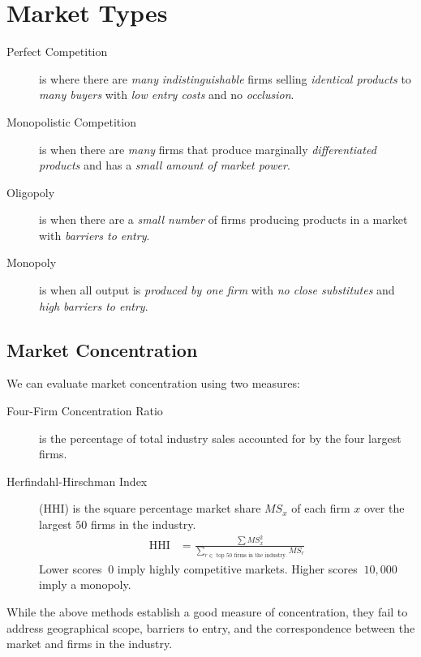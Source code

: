                 \section{Market Types} %
                \label{sec:market_types}
                    \begin{description}
                        \item[Perfect Competition] is where there are \textit{many} \textit{indistinguishable} firms selling \textit{identical products} to \textit{many buyers} with \textit{low entry costs} and no \textit{occlusion}.
                        \item[Monopolistic Competition] is when there are \textit{many} firms that produce marginally \textit{differentiated products} and has a \textit{small amount of market power}.
                        \item[Oligopoly] is when there are a \textit{small number} of firms producing products in a market with \textit{barriers to entry}.
                        \item[Monopoly] is when all output is \textit{produced by one firm} with \textit{no close substitutes} and \textit{high barriers to entry}.
                    \end{description}
                    \subsection{Market Concentration} %
                    \label{sub:market_concentration}
                        We can evaluate market concentration using two measures:
                        \begin{description}
                            \item[Four-Firm Concentration Ratio] is the percentage of total industry sales accounted for by the four largest firms.
                            \item[Herfindahl-Hirschman Index] (HHI) is the square percentage market share $MS_x$ of each firm $x$ over the largest $50$ firms in the industry.
                            \begin{align*}
                                \text{HHI} &=
                                \frac{\sum{MS_x^2}}{\sum_{r \in \text { top 50 firms in the industry.}}{MS_r}}
                            \end{align*}
                            Lower scores $~0$ imply highly competitive markets.
                            Higher scores $~10,000$ imply a monopoly.
                        \end{description}
                        While the above methods establish a good measure of concentration, they fail to address geographical scope, barriers to entry, and the correspondence between the market and firms in the industry.
